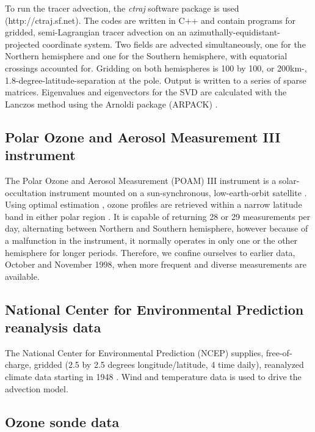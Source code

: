 \documentclass{article}
\begin{document}
To run the tracer advection, the \textit{ctraj} software package is used
(http://ctraj.sf.net).  The codes are written in C++ and contain programs
for gridded, semi-Lagrangian tracer advection on an 
azimuthally-equidistant-projected coordinate system.
Two fields are advected simultaneously, one for the Northern hemisphere
and one for the Southern hemisphere, with equatorial crossings accounted for.
Gridding on both hemispheres is 100 by 100, or 200km-,
1.8-degree-latitude-separation at the pole.  
Output is written to a series of sparse matrices.
Eigenvalues and eigenvectors for the SVD
are calculated with the Lanczos method \citep{Golub_Van_Loan1996} using the
Arnoldi package (ARPACK) \citep{Lehoucq_Scott1996}.

\subsection{Polar Ozone and Aerosol Measurement III instrument}

The Polar Ozone and Aerosol Measurement (POAM) III instrument is a solar-
occultation instrument mounted on a sun-synchronous, low-earth-orbit
satellite \citep{Lucke_etal1999}.  
Using optimal estimation \citep{Rodgers2000}, ozone profiles are retrieved 
within a narrow latitude band in either polar region \citep{Lumpe_etal2002}.  
It is capable of returning 28 or 29 measurements per day,
alternating between Northern and Southern hemisphere, however because of
a malfunction
in the instrument, it normally operates in only one or the other hemisphere for longer periods.  Therefore, we confine ourselves to earlier data,
October and November 1998, when more frequent and diverse measurements
are available.

\subsection{National Center for Environmental Prediction reanalysis data}

The National Center for Environmental Prediction (NCEP) supplies, 
free-of-charge,
gridded (2.5 by 2.5 degrees longitude/latitude, 4 time daily), reanalyzed 
climate data starting in 1948 \citep{Kalnay_etal1996}.
Wind and temperature data is used to drive the advection model.

\subsection{Ozone sonde data}
\end{document}
